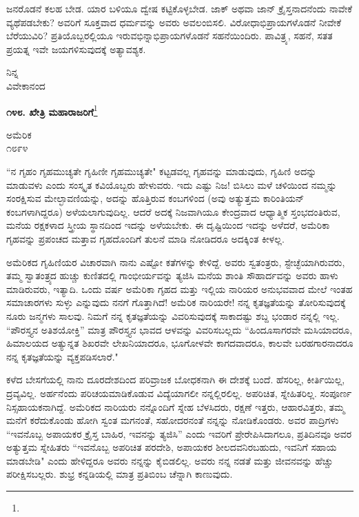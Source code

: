 ಜನರೊಡನೆ ಕಲಹ ಬೇಡ. ಯಾರ ಬಳಿಯೂ ದ್ವೇಷ ಕಟ್ಟಿಕೊಳ್ಳಬೇಡ. ಜಾಕ್ ಅಥವಾ ಜಾನ್ ಕ್ರೈಸ್ತನಾದನೆಂದು ನಾವೇಕೆ ವ್ಯಥೆಪಡಬೇಕು? ಅವರಿಗೆ ಸೂಕ್ತವಾದ ಧರ್ಮವನ್ನು ಅವರು ಅವಲಂಬಿಸಲಿ. ವಿರೋಧಾಭಿಪ್ರಾಯಗಳೊಡನೆ ನೀವೇಕೆ ಬೆರೆಯುವಿರಿ? ಪ್ರತಿಯೊಬ್ಬರಲ್ಲಿಯೂ ಇರುವಭಿನ್ನಾಭಿಪ್ರಾಯಗಳೊಡನೆ ಸಹನೆಯಿಂದಿರು. ಪಾವಿತ್ರ್ಯ, ಸಹನೆ, ಸತತ ಪ್ರಯತ್ನ ಇವೇ ಜಯಗಳಿಸುವುದಕ್ಕೆ ಅತ್ಯಾವಶ್ಯಕ.

\vspace{-0.5cm}

{\flushright
ನಿನ್ನ\\ವಿವೇಕಾನಂದ\par}

\begin{center}
\textbf{೧೪೮. ಖೇತ್ರಿ ಮಹಾರಾಜರಿಗೆ}\footnote{}
\end{center}

\vspace{-0.6cm}

\begin{flushright}
ಅಮೆರಿಕ\\೧೮೯೪
\end{flushright}

``ನ ಗೃಹಂ ಗೃಹಮುಚ್ಯತೇ ಗೃಹಿಣೀ ಗೃಹಮುಚ್ಯತೇ" ಕಟ್ಟಡವಲ್ಲ ಗೃಹವನ್ನು ಮಾಡುವುದು, ಗೃಹಿಣಿ ಅದನ್ನು ಮಾಡುವಳು ಎಂದು ಸಂಸ್ಕೃತ ಕವಿಯೊಬ್ಬರು ಹೇಳುವರು. ಇದು ಎಷ್ಟು ನಿಜ! ಬಿಸಿಲು ಮಳೆ ಚಳಿಯಿಂದ ನಮ್ಮನ್ನು ಸಂರಕ್ಷಿಸುವ ಮೇಲ್ಛಾವಣಿಯನ್ನು, ಅದನ್ನು ಹೊತ್ತಿರುವ ಕಂಬಗಳಿಂದ (ಅವು ಅತ್ಯುತ್ತಮ ಕಾರಿಂತಿಯನ್‌ ಕಂಬಗಳಾಗಿದ್ದರೂ) ಅಳೆಯಲಾಗುವುದಿಲ್ಲ. ಆದರೆ ಅದಕ್ಕೆ ನಿಜವಾಗಿಯೂ ಕೇಂದ್ರವಾದ ಆಧ್ಯಾತ್ಮಿಕ ಸ್ತಂಭದಂತಿರುವ, ಮನೆಯ ರಕ್ಷಕಳಾದ ಸ್ತ್ರೀಯ ಸ್ಥಾನದಿಂದ ಇದನ್ನು ಅಳೆಯಬೇಕು. ಈ ದೃಷ್ಟಿಯಿಂದ ಇದನ್ನು ಅಳೆದರೆ, ಅಮೆರಿಕಾ ಗೃಹವನ್ನು ಪ್ರಪಂಚದ ಮತ್ತಾವ ಗೃಹದೊಂದಿಗೆ ತುಲನೆ ಮಾಡಿ ನೋಡಿದರೂ ಅದಕ್ಕಿಂತ ಕೀಳಲ್ಲ.

ಅಮೆರಿಕದ ಗೃಹಿಣಿಯರ ವಿಚಾರವಾಗಿ ನಾನು ಎಷ್ಟೋ ಕತೆಗಳನ್ನು ಕೇಳಿದ್ದೆ. ಅವರು ಸ್ವತಂತ್ರರು, ಸ್ಟೇಚ್ಛೆಯಾಗಿರುವರು, ತಮ್ಮ ಸ್ವಾತಂತ್ರ್ಯದ ಹುಚ್ಚು ಕುಣಿತದಲ್ಲಿ ಗಾಂಭೀರ್ಯವನ್ನು ತ್ಯಜಿಸಿ ಮನೆಯ ಶಾಂತಿ ಸೌಹಾರ್ದವನ್ನು ಅವರು ಹಾಳು ಮಾಡಿರುವರು, ಇತ್ಯಾದಿ. ಒಂದು ವರ್ಷ ಅಮೆರಿಕಾ ಗೃಹದ ಮತ್ತು ಇಲ್ಲಿಯ ನಾರಿಯರ ಅನುಭವವಾದ ಮೇಲೆ ಇಂತಹ ಸಮಾಚಾರಗಳು ಸುಳ್ಳು ಎನ್ನುವುದು ನನಗೆ ಗೊತ್ತಾಗಿದೆ! ಅಮೆರಿಕ ನಾರಿಯರೇ! ನನ್ನ ಕೃತಜ್ಞತೆಯನ್ನು ತೋರಿಸುವುದಕ್ಕೆ ನೂರು ಜನ್ಮಗಳು ಸಾಲವು. ನಿಮಗೆ ನನ್ನ ಕೃತಜ್ಞತೆಯನ್ನು ವಿವರಿಸುವುದಕ್ಕೆ ಸಾಕಾದಷ್ಟು ಶಬ್ದ ಭಂಡಾರ ನನ್ನಲ್ಲಿ ಇಲ್ಲ. ``ಪೌರಸ್ತ್ಯನ ಅತಿಶಯೋಕ್ತಿ'' ಮಾತ್ರ ಪೌರಸ್ತ್ಯನ ಭಾವದ ಆಳವನ್ನು ವಿವರಿಸಬಲ್ಲದು\enginline{-} ``ಹಿಂದೂಸಾಗರವೇ ಮಸಿಯಾದರೂ, ಹಿಮಾಲಯದ ಅತ್ಯುನ್ನತ ಶಿಖರವೇ ಲೇಖನಿಯಾದರೂ, ಭೂಗೋಳವೇ ಕಾಗದವಾದರೂ, ಕಾಲವೇ ಬರಹಗಾರನಾದರೂ ನನ್ನ ಕೃತಜ್ಞತೆಯನ್ನು ವ್ಯಕ್ತಪಡಿಸಲಾರೆ."

ಕಳೆದ ಬೇಸಗೆಯಲ್ಲಿ ನಾನು ದೂರದೇಶದಿಂದ ಪರಿವ್ರಾಜಕ ಬೋಧಕನಾಗಿ ಈ ದೇಶಕ್ಕೆ ಬಂದೆ. ಹೆಸರಿಲ್ಲ, ಕೀರ್ತಿಯಿಲ್ಲ, ದ್ರವ್ಯವಿಲ್ಲ. ಅರ್ಹನೆಂದು ಪರಿಚಯಮಾಡಿಕೊಡುವ ವಿದ್ಯೆಯಾಗಲೀ ನನ್ನಲ್ಲಿರಲಿಲ್ಲ. ಅಪರಿಚಿತ, ಸ್ನೇಹಿತರಿಲ್ಲ. ಸಂಪೂರ್ಣ ನಿಸ್ಸಹಾಯಕನಾಗಿದ್ದೆ. ಅಮೆರಿಕದ ನಾರಿಯರು ನನ್ನೊಂದಿಗೆ ಸ್ನೇಹ ಬೆಳಸಿದರು, ರಕ್ಷಣೆ ಇತ್ತರು, ಆಹಾರವಿತ್ತರು, ತಮ್ಮ ಮನೆಗೆ ಕರೆದುಕೊಂಡು ಹೋಗಿ ಸ್ವಂತ ಮಗನಂತೆ, ಸಹೋದರನಂತೆ ನನ್ನನ್ನು ನೋಡಿಕೊಂಡರು. ಅವರ ಪಾದ್ರಿಗಳು “ಇವನೊಬ್ಬ ಅಪಾಯಕರ ಕ್ರೈಸ್ತ ಬಾಹಿರ, ಇವನನ್ನು ತ್ಯಜಿಸಿ” ಎಂದು ಇವರಿಗೆ ಪ್ರೇರೇಪಿಸಿದಾಗಲೂ, ಪ್ರತಿದಿನವೂ ಅವರ ಅತ್ಯುತ್ತಮ ಸ್ನೇಹಿತರು “ಇವನೊಬ್ಬ ಅಪರಿಚಿತ ಪರದೇಶಿ, ಅಪಾಯಕರ ಶೀಲದವನಿರಬಹುದು, ಇವನಿಗೆ ಸಹಾಯ ಮಾಡಬೇಡಿ" ಎಂದು ಹೇಳಿದ್ದರೂ ಅವರು ನನ್ನನ್ನು ಕೈಬಿಡಲಿಲ್ಲ. ಅವರು ನನ್ನ ನಡತೆ ಮತ್ತು ಜೀವನವನ್ನು ಹೆಚ್ಚು ಪರೀಕ್ಷಿಸಬಲ್ಲರು. ಶುಭ್ರ ಕನ್ನಡಿಯಲ್ಲಿ ಮಾತ್ರ ಪ್ರತಿಬಿಂಬ ಚೆನ್ನಾಗಿ ಕಾಣುವುದು.

